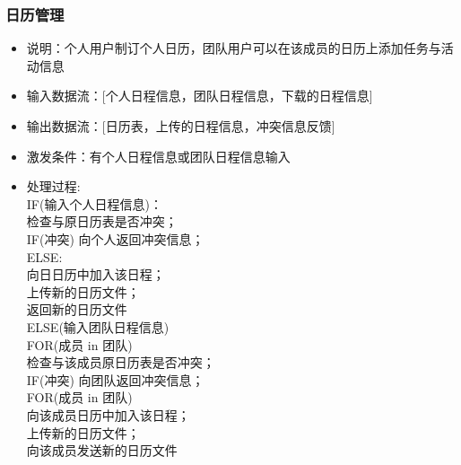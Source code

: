             \subsubsection{日历管理}
            \begin{itemize}
                \item 说明：个人用户制订个人日历，团队用户可以在该成员的日历上添加任务与活动信息
                \item 输入数据流：[个人日程信息，团队日程信息，下载的日程信息]
                \item 输出数据流：[日历表，上传的日程信息，冲突信息反馈]
                \item 激发条件：有个人日程信息或团队日程信息输入
                \item 处理过程:   \\
                      IF(输入个人日程信息)：\\
                        检查与原日历表是否冲突；\\
                      IF(冲突) 向个人返回冲突信息；\\
                      ELSE:\\
                        向日日历中加入该日程；\\
                        上传新的日历文件；\\
                        返回新的日历文件\\
                     ELSE(输入团队日程信息)\\
                    FOR(成员 in 团队)\\
                        检查与该成员原日历表是否冲突；\\
                        IF(冲突) 向团队返回冲突信息；\\
                    
                    FOR(成员 in 团队)\\
                        向该成员日历中加入该日程；\\
                        上传新的日历文件；\\
                        向该成员发送新的日历文件\\
            \end{itemize}
